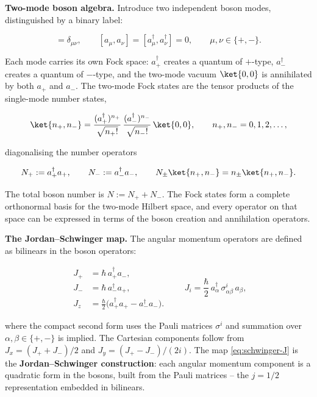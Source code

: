 \medskip\noindent\textbf{Two-mode boson algebra.}
Introduce two independent boson modes, distinguished by a binary label:
\begin{linenomath}
  \begin{equation}
    [a_\mu, a_\nu^\dagger] = \delta_{\mu\nu},
    \qquad
    [a_\mu, a_\nu] = [a_\mu^\dagger, a_\nu^\dagger] = 0,
    \qquad
    \mu,\nu \in \{+,-\}.
    \label{eq:schwinger-bosons}
  \end{equation}
\end{linenomath}
Each mode carries its own Fock space: $a_+^\dagger$ creates a quantum of $+$-type, $a_-^\dagger$ creates a quantum of $-$-type, and the two-mode vacuum $\ket{0,0}$ is annihilated by both $a_+$ and $a_-$. The two-mode Fock states are the tensor products of the single-mode number states,
\begin{linenomath}
  \begin{equation*}
    \ket{n_+, n_-}
    = \frac{(a_+^\dagger)^{n_+}}{\sqrt{n_+!}}\,
      \frac{(a_-^\dagger)^{n_-}}{\sqrt{n_-!}}\,
      \ket{0,0},
    \qquad
    n_+, n_- = 0,1,2,\ldots,
  \end{equation*}
\end{linenomath}
diagonalising the number operators
\begin{linenomath}
  \begin{equation*}
    N_+ := a_+^\dagger a_+,\qquad
    N_- := a_-^\dagger a_-,\qquad
    N_\pm\ket{n_+,n_-} = n_\pm\ket{n_+,n_-}.
  \end{equation*}
\end{linenomath}
The total boson number is $N := N_+ + N_-$. The Fock states form a complete orthonormal basis for the two-mode Hilbert space, and every operator on that space can be expressed in terms of the boson creation and annihilation operators.

\medskip\noindent\textbf{The Jordan--Schwinger map.}
The angular momentum operators are defined as bilinears in the boson operators:
\begin{linenomath}
  \begin{equation}
    \begin{aligned}
      J_+ &= \hbar\,a_+^\dagger a_-, \\
      J_- &= \hbar\,a_-^\dagger a_+, \\
      J_z &= \frac{\hbar}{2}\bigl(a_+^\dagger a_+ - a_-^\dagger a_-\bigr).
    \end{aligned}
    \qquad
    J_i = \frac{\hbar}{2}\,a_\alpha^\dagger\,\sigma^i_{\alpha\beta}\,a_\beta,
    \label{eq:schwinger-J}
  \end{equation}
\end{linenomath}
where the compact second form uses the Pauli matrices $\sigma^i$ and summation over $\alpha,\beta\in\{+,-\}$ is implied. The Cartesian components follow from $J_x = (J_+ + J_-)/2$ and $J_y = (J_+ - J_-)/(2i)$. The map \eqref{eq:schwinger-J} is the \textbf{Jordan--Schwinger construction}: each angular momentum component is a quadratic form in the bosons, built from the Pauli matrices -- the $j=1/2$ representation embedded in bilinears.


